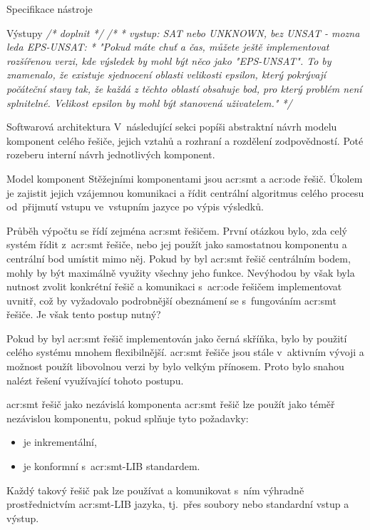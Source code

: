 \documentclass[thesis=M,czech]{FITthesis}[2012/06/26]
\newcommand{\acrlabel}[1]{acr:#1}
\newcommand{\acr}[1]{\acrshort{\acrlabel{#1}}}
\newcommand{\cmt}[1]{\textit{/* #1 */}}
\begin{document}
\begin{section}{Specifikace nástroje}
\begin{subsection}{Výstupy}
\cmt{doplnit}
\cmt{* vystup: SAT nebo UNKNOWN, bez UNSAT - mozna leda EPS-UNSAT:
  * "Pokud máte chuť a čas, můžete ještě implementovat rozšířenou verzi, kde výsledek by mohl být něco jako "EPS-UNSAT". To by znamenalo, že existuje sjednocení oblasti velikosti epsilon, který pokrývají počáteční stavy tak, že každá z těchto oblastí obsahuje bod, pro který problém není splnitelné. Velikost epsilon by mohl být stanovená uživatelem."}
\end{subsection} %


\end{section} %


\begin{section}{Softwarová architektura}\label{s:design:arch}
V~následující sekci popíši abstraktní návrh
modelu komponent celého řešiče,
jejich vztahů a rozhraní a rozdělení zodpovědností.
Poté rozeberu interní návrh jednotlivých komponent.


\begin{subsection}{Model komponent}\label{ss:design:arch:comp}
Stěžejními komponentami jsou \acr{smt} a \acr{ode} řešič.
Úkolem je zajistit jejich vzájemnou komunikaci
a řídit centrální algoritmus celého procesu
od~přijmutí vstupu ve~vstupním jazyce po výpis výsledků.

Průběh výpočtu se řídí zejména \acr{smt} řešičem.
První otázkou bylo, zda celý systém řídit
z~\acr{smt} řešiče, nebo jej použít jako samostatnou komponentu
a centrální bod umístit mimo něj.
Pokud by byl \acr{smt} řešič centrálním bodem,
mohly by být maximálně využity všechny jeho funkce.
Nevýhodou by však byla nutnost
zvolit konkrétní řešič
a komunikaci s~\acr{ode} řešičem
implementovat uvnitř,
což by vyžadovalo podrobnější obeznámení se
s~fungováním \acr{smt} řešiče.
Je však tento postup nutný?

Pokud by byl \acr{smt} řešič
implementován jako černá skříňka,
bylo by použití celého systému mnohem flexibilnější.
\acr{smt} řešiče jsou stále v~aktivním vývoji
a možnost použít libovolnou verzi
by bylo velkým přínosem.
Proto bylo snahou nalézt řešení
využívající tohoto postupu.


\begin{subsubsection}{\acr{smt} řešič jako nezávislá komponenta}
\label{sss:design:arch:comp:smt}
\acr{smt} řešič lze použít
jako téměř nezávislou komponentu,
pokud splňuje tyto požadavky:
\begin{itemize}
\item je inkrementální,
\item je konformní s~\acr{smt}-LIB standardem.
\end{itemize}
Každý takový řešič pak lze používat
a komunikovat s~ním výhradně prostřednictvím
\acr{smt}-LIB jazyka,
tj.~přes soubory nebo standardní vstup a výstup.


\end{subsubsection}
\end{subsection}
\end{section}
\end{document}
